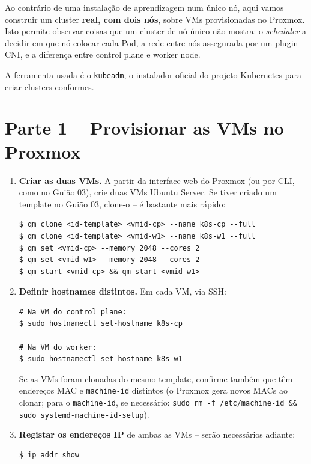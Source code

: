 \documentclass[11pt,a4paper]{article}
\begin{document}
Ao contrário de uma instalação de aprendizagem num único nó, aqui vamos construir um cluster \textbf{real, com dois nós}, sobre VMs provisionadas no Proxmox. Isto permite observar coisas que um cluster de nó único não mostra: o \emph{scheduler} a decidir em que nó colocar cada Pod, a rede entre nós assegurada por um plugin CNI, e a diferença entre control plane e worker node.

A ferramenta usada é o \texttt{kubeadm}, o instalador oficial do projeto Kubernetes para criar clusters conformes.

\section{Parte 1 -- Provisionar as VMs no Proxmox}
\begin{enumerate}[label=\arabic*.]

  \item \textbf{Criar as duas VMs.} A partir da interface web do Proxmox (ou por CLI, como no Guião 03), crie duas VMs Ubuntu Server. Se tiver criado um template no Guião 03, clone-o -- é bastante mais rápido:
\begin{lstlisting}
$ qm clone <id-template> <vmid-cp> --name k8s-cp --full
$ qm clone <id-template> <vmid-w1> --name k8s-w1 --full
$ qm set <vmid-cp> --memory 2048 --cores 2
$ qm set <vmid-w1> --memory 2048 --cores 2
$ qm start <vmid-cp> && qm start <vmid-w1>
\end{lstlisting}

  \item \textbf{Definir hostnames distintos.} Em cada VM, via SSH:
\begin{lstlisting}
# Na VM do control plane:
$ sudo hostnamectl set-hostname k8s-cp

# Na VM do worker:
$ sudo hostnamectl set-hostname k8s-w1
\end{lstlisting}
  Se as VMs foram clonadas do mesmo template, confirme também que têm endereços MAC e \texttt{machine-id} distintos (o Proxmox gera novos MACs ao clonar; para o \texttt{machine-id}, se necessário: \texttt{sudo rm -f /etc/machine-id \&\& sudo systemd-machine-id-setup}).

  \item \textbf{Registar os endereços IP} de ambas as VMs -- serão necessários adiante:
\begin{lstlisting}
$ ip addr show
\end{lstlisting}

\end{enumerate}
\end{document}
